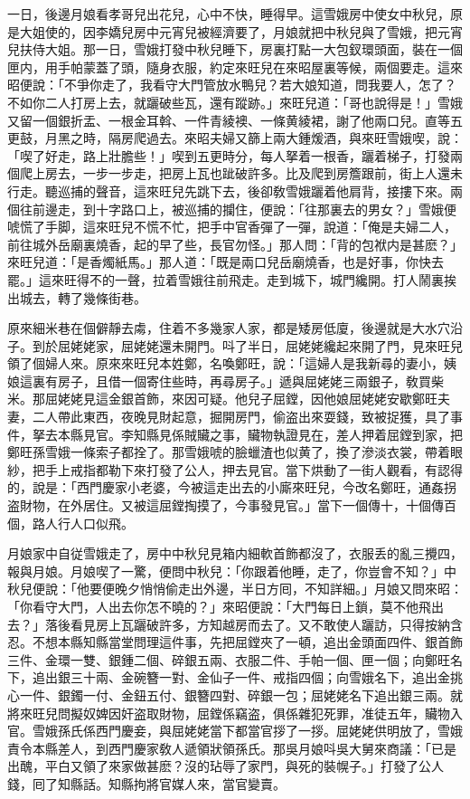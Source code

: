 一日，後邊月娘看孝哥兒出花兒，心中不快，睡得早。這雪娥房中使女中秋兒，原是大姐使的，因李嬌兒房中元宵兒被經濟要了，月娘就把中秋兒與了雪娥，把元宵兒扶侍大姐。那一日，雪娥打發中秋兒睡下，房裏打點一大包釵環頭面，裝在一個匣内，用手帕蒙蓋了頭，隨身衣服，約定來旺兒在來昭屋裏等候，兩個要走。這來昭便說：「不爭你走了，我看守大門管放水鴨兒？若大娘知道，問我要人，怎了？不如你二人打房上去，就躧破些瓦，還有蹤跡。」來旺兒道：「哥也說得是！」雪娥又留一個銀折盂、一根金耳斡、一件青綾襖、一條黄綾裙，謝了他兩口兒。直等五更鼓，月黑之時，隔房爬過去。來昭夫婦又篩上兩大鍾煖酒，與來旺雪娥喫，說：「喫了好走，路上壯膽些！」喫到五更時分，每人拏着一根香，躧着梯子，打發兩個爬上房去，一步一步走，把房上瓦也跐破許多。比及爬到房簷跟前，街上人還未行走。聽巡捕的聲音，這來旺兒先跳下去，後卻敎雪娥躧着他肩背，接摟下來。兩個往前邊走，到十字路口上，被巡捕的攔住，便說：「往那裏去的男女？」雪娥便唬慌了手脚，這來旺兒不慌不忙，把手中官香彈了一彈，說道：「俺是夫婦二人，前往城外岳廟裏燒香，起的早了些，長官勿怪。」那人問：「背的包袱内是甚麽？」來旺兒道：「是香燭紙馬。」那人道：「既是兩口兒岳廟燒香，也是好事，你快去罷。」這來旺得不的一聲，拉着雪娥往前飛走。走到城下，城門纔開。打人鬧裏挨出城去，轉了幾條街巷。

原來細米巷在個僻靜去䖏，住着不多幾家人家，都是矮房低廈，後邊就是大水穴沿子。到於屈姥姥家，屈姥姥還未開門。呌了半日，屈姥姥纔起來開了門，見來旺兒領了個婦人來。原來來旺兒本姓鄭，名喚鄭旺，說：「這婦人是我新尋的妻小，姨娘這裏有房子，且借一個寄住些時，再尋房子。」遞與屈姥姥三兩銀子，敎買柴米。那屈姥姥見這金銀首飾，來因可疑。他兒子屈鏜，因他娘屈姥姥安歇鄭旺夫妻，二人帶此東西，夜晚見財起意，掘開房門，偷盗出來耍錢，致被捉獲，具了事件，拏去本縣見官。李知縣見係賊贜之事，贜物執證見在，差人押着屈鏜到家，把鄭旺孫雪娥一條索子都拴了。那雪娥唬的臉蠟渣也似黄了，換了滲淡衣裳，帶着眼紗，把手上戒指都勒下來打發了公人，押去見官。當下烘動了一街人觀看，有認得的，說是：「西門慶家小老婆，今被這走出去的小廝來旺兒，今改名鄭旺，通姦拐盗財物，在外居住。又被這屈鏜掏摸了，今事發見官。」當下一個傳十，十個傳百個，路人行人口似飛。

月娘家中自従雪娥走了，房中中秋兒見箱内細軟首飾都沒了，衣服丢的亂三攪四，報與月娘。月娘喫了一驚，便問中秋兒：「你跟着他睡，走了，你豈會不知？」中秋兒便說：「他要便晚夕悄悄偷走出外邊，半日方囘，不知詳細。」月娘又問來昭：「你看守大門，人出去你怎不曉的？」來昭便說：「大門每日上鎖，莫不他飛出去？」落後看見房上瓦躧破許多，方知越房而去了。又不敢使人躧訪，只得按納含忍。不想本縣知縣當堂問理這件事，先把屈鏜夾了一頓，追出金頭面四件、銀首飾三件、金環一雙、銀鍾二個、碎銀五兩、衣服二件、手帕一個、匣一個；向鄭旺名下，追出銀三十兩、金碗簪一對、金仙子一件、戒指四個；向雪娥名下，追出金挑心一件、銀鐲一付、金鈕五付、銀簪四對、碎銀一包；屈姥姥名下追出銀三兩。就將來旺兒問擬奴婢因奸盗取財物，屈鏜係竊盗，俱係雜犯死罪，准徒五年，贜物入官。雪娥孫氏係西門慶妾，與屈姥姥當下都當官拶了一拶。屈姥姥供明放了，雪娥責令本縣差人，到西門慶家敎人遞領狀領孫氏。那吳月娘呌吳大舅來商議：「已是出醜，平白又領了來家做甚麽？沒的玷辱了家門，與死的裝幌子。」打發了公人錢，囘了知縣話。知縣拘將官媒人來，當官變賣。

